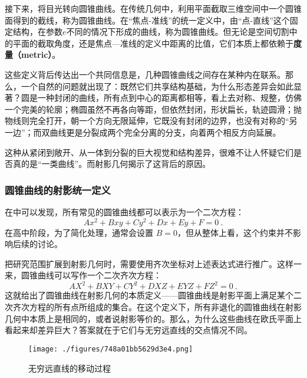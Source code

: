 接下来，将目光转向圆锥曲线。在传统几何中，利用平面截取三维空间中一个圆锥面得到的截线，称为圆锥曲线。在“焦点-准线”的统一定义中，由“点-直线”这个固定结构，在参数$e$不同的情况下形成的曲线，称为圆锥曲线。但无论是空间切割中的平面的截取角度，还是焦点—准线的定义中距离的比值，它们本质上都依赖于\textbf{度量（metric）}。

这些定义背后传达出一个共同信息是，几种圆锥曲线之间存在某种内在联系。那么，一个自然的问题就出现了：既然它们共享结构基础，为什么形态差异会如此显著？圆是一种封闭的曲线，所有点到中心的距离都相等，看上去对称、规整，仿佛一个完美的轮廓；椭圆虽然不再各向等距，但依然封闭，形状扁长，轨迹圆滑；抛物线则完全打开，朝一个方向无限延伸，它既没有封闭的边界，也没有对称的“另一边”；而双曲线更是分裂成两个完全分离的分支，向着两个相反方向延展。

这种从紧闭到敞开、从一体到分裂的巨大视觉和结构差异，很难不让人怀疑它们是否真的是“一类曲线”。而射影几何揭示了这背后的原因。

\subsubsection{圆锥曲线的射影统一定义}

在中可以发现，所有常见的圆锥曲线都可以表示为一个二次方程：
\begin{equation}
Ax^2+Bxy+Cy^2+Dx+Ey+F=0~.
\end{equation}
在高中阶段，为了简化处理，通常会设置 $B = 0$，但从整体上看，这个约束并不影响后续的讨论。

把研究范围扩展到射影几何时，需要使用齐次坐标对上述表达式进行推广。这样一来，圆锥曲线可以写作一个二次齐次方程：
\begin{equation}
AX^2 + BXY + CY^2 + DXZ + EYZ + FZ^2 = 0~.
\end{equation}
这就给出了圆锥曲线在射影几何的本质定义——圆锥曲线是射影平面上满足某个二次齐次方程的所有点所组成的集合。在这个定义下，所有非退化的圆锥曲线在射影几何中本质上是相同的，或者说射影等价的。那么，为什么这些曲线在欧氏平面上看起来却差异巨大？答案就在于它们与无穷远直线的交点情况不同。

\begin{figure}[ht]
\centering
\texttt{[image: ./figures/748a01bb5629d3e4.png]}
\caption{无穷远直线的移动过程} \label{fig_HsPGCC_3}
\end{figure}

